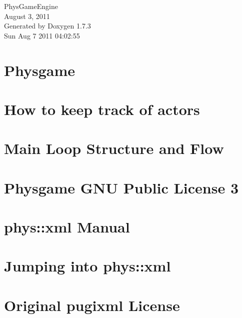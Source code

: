 \documentclass[a4paper]{article}
\begin{document}
\hypersetup{pageanchor=false}
\begin{titlepage}
\vspace*{7cm}
\begin{center}
{\Large PhysGameEngine \\[1ex]\large August 3, 2011 }\\
\vspace*{1cm}
{\large Generated by Doxygen 1.7.3}\\
\vspace*{0.5cm}
{\small Sun Aug 7 2011 04:02:55}\\
\end{center}
\end{titlepage}
\tableofcontents
{}
\hypersetup{pageanchor=true}
\section{Physgame}
\label{index}\hypertarget{index}{}
\section{How to keep track of actors}
\label{actorcontainer1}
\hypertarget{actorcontainer1}{}

\section{Main Loop Structure and Flow}
\label{mainloop1}
\hypertarget{mainloop1}{}

\section{Physgame GNU Public License 3}
\label{GPLLicense}
\hypertarget{GPLLicense}{}

\section{phys::xml Manual}
\label{XMLManual}
\hypertarget{XMLManual}{}

\section{Jumping into phys::xml}
\label{XMLQuickStart}
\hypertarget{XMLQuickStart}{}

\section{Original pugixml License}
\label{OriginalpugixmlLicense}
\hypertarget{OriginalpugixmlLicense}{}

\end{document}
